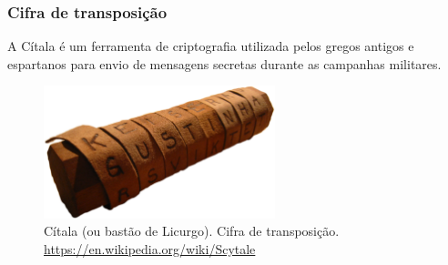 \begin{frame}
\frametitle{Cifra de transposição}

A Cítala é um ferramenta de criptografia utilizada pelos gregos antigos e espartanos para envio de mensagens secretas
durante as campanhas militares.
\begin{figure}[h]
\centering
\includegraphics[width=0.6\textwidth,height=0.5\textheight,keepaspectratio]{figures/cifratransposicao.png}
\caption{Cítala (ou bastão de Licurgo). Cifra de transposição. \url{https://en.wikipedia.org/wiki/Scytale}}
\label{fig-cifratrans}
\end{figure}
\end{frame}


